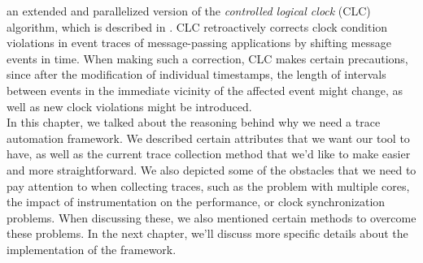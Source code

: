an extended and parallelized version of the \emph{controlled logical
clock} (CLC) algorithm, which is described in \cite{brwl09}. CLC
retroactively corrects clock condition violations in event traces of
message-passing applications by shifting message events in time. When
making such a correction, CLC makes certain precautions, since
after the modification of individual timestamps, the length of
intervals between events in the immediate vicinity of the affected
event might change, as well as new clock violations might be
introduced.\\[0.5cm]
In this chapter, we talked about the reasoning behind why we need a
trace automation framework. We described certain attributes that we
want our tool to have, as well as the current trace collection method
that we'd like to make easier and more straightforward. We also
depicted some of the obstacles that we need to pay attention to when
collecting traces, such as the problem with multiple cores, the impact
of instrumentation on the performance, or clock synchronization
problems. When discussing these, we also mentioned certain methods to
overcome these problems. In the next
chapter, we'll discuss more specific details about the implementation
of the framework.
